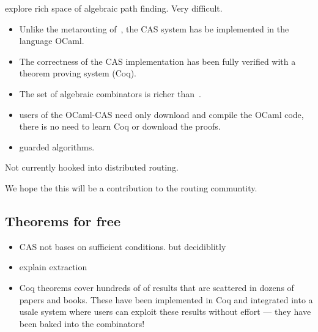 

explore rich space of algebraic path finding.
Very difficult.


\begin{itemize}
\item Unlike the metarouting of~\cite{griffin05metarouting},
      the CAS system has be implemented in the language OCaml. 
\item The correctness of the CAS implementation has been
  fully verified with a theorem proving system (Coq).
\item The set of algebraic combinators is richer than~\cite{griffin05metarouting}.
\item users of the OCaml-CAS need only download and compile the OCaml code,
  there is no need to learn Coq or download the proofs.
\item guarded algorithms.   
\end{itemize}

Not currently hooked into distributed routing. 

We hope the this will be a contribution to the routing communtity.

\subsection{Theorems for free}


\begin{itemize}
\item CAS not bases on sufficient conditions. but decidiblitly 
\item explain extraction 
\item Coq theorems cover hundreds of of results that are scattered in
  dozens of papers and books.
  These have been implemented in Coq and integrated into a usale system
  where users can exploit these results without effort --- they have been
  baked into the combinators! 
\end{itemize}  
